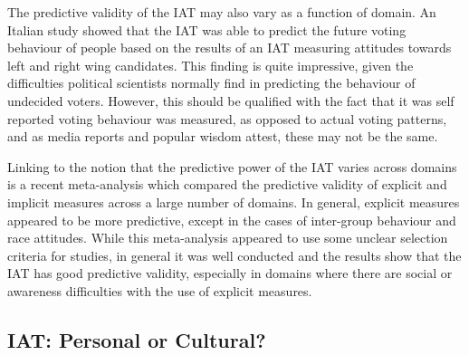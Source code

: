 The predictive validity of the IAT may also vary as a function of domain. An Italian study \cite{Arcuri2008} showed that the IAT was able to predict the future voting behaviour of people based on the results of an IAT measuring attitudes towards left and right wing candidates. This finding is quite impressive, given the difficulties political scientists normally find in predicting the behaviour of undecided voters. However, this should be qualified with the fact that it was self reported voting behaviour was measured, as opposed to actual voting patterns, and as media reports and popular wisdom attest, these may not be the same.   

Linking to the notion that the predictive power of the IAT varies across domains is a recent meta-analysis \cite{Greenwald2009} which compared the predictive validity of explicit and implicit measures across a large number of domains. In general, explicit measures appeared to be more predictive, except in the cases of inter-group behaviour and race attitudes. While this meta-analysis appeared to use some unclear selection criteria for studies, in general it was well conducted and the results show that the IAT has good predictive validity, especially in domains where there are social or awareness difficulties with the use of explicit measures. 

\subsection{IAT: Personal or Cultural?}

